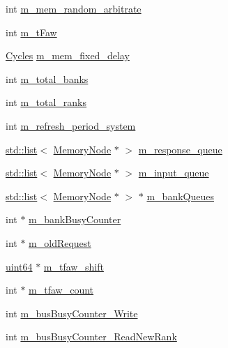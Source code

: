 \begin{DoxyCompactItemize}
\item 
int \hyperlink{classRubyMemoryControl_a84dc4df49177ba4931742af171541561}{m\_\-mem\_\-random\_\-arbitrate}
\item 
int \hyperlink{classRubyMemoryControl_a278ccfdcd299cca636085e30b57bd77b}{m\_\-tFaw}
\item 
\hyperlink{classCycles}{Cycles} \hyperlink{classRubyMemoryControl_add64256c91bc7722347f3a8dfe94d375}{m\_\-mem\_\-fixed\_\-delay}
\item 
int \hyperlink{classRubyMemoryControl_ad36478de555240b1cd80c5b0aa4b00cc}{m\_\-total\_\-banks}
\item 
int \hyperlink{classRubyMemoryControl_ae56d0b2636a76e0d08eb304c9845540c}{m\_\-total\_\-ranks}
\item 
int \hyperlink{classRubyMemoryControl_ac226affdfdce1041cdc1adcea108d2d9}{m\_\-refresh\_\-period\_\-system}
\item 
\hyperlink{classstd_1_1list}{std::list}$<$ \hyperlink{classMemoryNode}{MemoryNode} $\ast$ $>$ \hyperlink{classRubyMemoryControl_a6ff73bc35f01b71460125c8973fdcf7f}{m\_\-response\_\-queue}
\item 
\hyperlink{classstd_1_1list}{std::list}$<$ \hyperlink{classMemoryNode}{MemoryNode} $\ast$ $>$ \hyperlink{classRubyMemoryControl_ad59ead9befd4b8ed53d20e31025cc5f2}{m\_\-input\_\-queue}
\item 
\hyperlink{classstd_1_1list}{std::list}$<$ \hyperlink{classMemoryNode}{MemoryNode} $\ast$ $>$ $\ast$ \hyperlink{classRubyMemoryControl_a66d0e61e247049647c7e205d7898f593}{m\_\-bankQueues}
\item 
int $\ast$ \hyperlink{classRubyMemoryControl_a258db92f2ca2cd3335e798fbe1cea189}{m\_\-bankBusyCounter}
\item 
int $\ast$ \hyperlink{classRubyMemoryControl_a546d324998c9280e60ad0d3bdc33b660}{m\_\-oldRequest}
\item 
\hyperlink{TypeDefines_8hh_a29940ae63ec06c9998bba873e25407ad}{uint64} $\ast$ \hyperlink{classRubyMemoryControl_a9dd1941af4ea267b9f8e05a54c70d713}{m\_\-tfaw\_\-shift}
\item 
int $\ast$ \hyperlink{classRubyMemoryControl_a8399af800996db69e2cb64997f0123f4}{m\_\-tfaw\_\-count}
\item 
int \hyperlink{classRubyMemoryControl_a4c6490a8d96034781b7f019c9875637d}{m\_\-busBusyCounter\_\-Write}
\item 
int \hyperlink{classRubyMemoryControl_a9396a0f34b9eb0d3c51bedc04de53b10}{m\_\-busBusyCounter\_\-ReadNewRank}
\item 

\end{DoxyCompactItemize}
